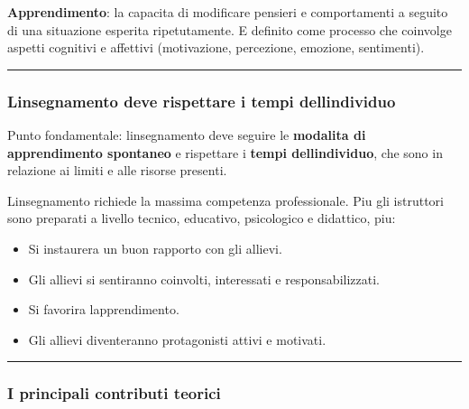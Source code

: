 \documentclass[a4paper,11pt]{article}
\providecommand{\tightlist}{%
  \setlength{\itemsep}{0pt}\setlength{\parskip}{0pt}}
\begin{document}
\textbf{Apprendimento}: la capacita di modificare pensieri e
comportamenti a seguito di una situazione esperita ripetutamente. E
definito come processo che coinvolge aspetti cognitivi e affettivi
(motivazione, percezione, emozione, sentimenti).

\begin{center}\rule{0.5\linewidth}{0.5pt}\end{center}

\subsubsection{L\textquotesingle insegnamento deve rispettare i tempi
      dell\textquotesingle individuo}\label{linsegnamento-deve-rispettare-i-tempi-dellindividuo}

Punto fondamentale: l\textquotesingle insegnamento deve seguire le
\textbf{modalita di apprendimento spontaneo} e rispettare i
\textbf{tempi dell\textquotesingle individuo}, che sono in relazione ai
limiti e alle risorse presenti.

L\textquotesingle insegnamento richiede la massima competenza
professionale. Piu gli istruttori sono preparati a livello tecnico,
educativo, psicologico e didattico, piu:

\begin{itemize}
      \tightlist
      \item
            Si instaurera un buon rapporto con gli allievi.
      \item
            Gli allievi si sentiranno coinvolti, interessati e responsabilizzati.
      \item
            Si favorira l\textquotesingle apprendimento.
      \item
            Gli allievi diventeranno protagonisti attivi e motivati.
\end{itemize}

\begin{center}\rule{0.5\linewidth}{0.5pt}\end{center}

\subsubsection{I principali contributi
      teorici}\label{i-principali-contributi-teorici}
\end{document}
